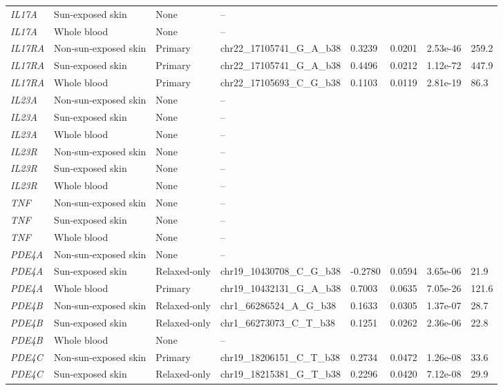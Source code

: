 \documentclass[10pt,a4paper]{article}
\begin{document}
\begin{landscape}
\begin{longtable}{p{1.7cm}p{3.3cm}p{2.2cm}p{5.0cm}p{1.8cm}p{1.8cm}p{2.2cm}p{1.3cm}}
\textit{IL17A} & Sun-exposed skin & None & -- &  &  &  &  \\
\textit{IL17A} & Whole blood & None & -- &  &  &  &  \\
\textit{IL17RA} & Non-sun-exposed skin & Primary & chr22\_17105741\_G\_A\_b38 & 0.3239 & 0.0201 & 2.53e-46 & 259.2 \\
\textit{IL17RA} & Sun-exposed skin & Primary & chr22\_17105741\_G\_A\_b38 & 0.4496 & 0.0212 & 1.12e-72 & 447.9 \\
\textit{IL17RA} & Whole blood & Primary & chr22\_17105693\_C\_G\_b38 & 0.1103 & 0.0119 & 2.81e-19 & 86.3 \\
\textit{IL23A} & Non-sun-exposed skin & None & -- &  &  &  &  \\
\textit{IL23A} & Sun-exposed skin & None & -- &  &  &  &  \\
\textit{IL23A} & Whole blood & None & -- &  &  &  &  \\
\textit{IL23R} & Non-sun-exposed skin & None & -- &  &  &  &  \\
\textit{IL23R} & Sun-exposed skin & None & -- &  &  &  &  \\
\textit{IL23R} & Whole blood & None & -- &  &  &  &  \\
\textit{TNF} & Non-sun-exposed skin & None & -- &  &  &  &  \\
\textit{TNF} & Sun-exposed skin & None & -- &  &  &  &  \\
\textit{TNF} & Whole blood & None & -- &  &  &  &  \\
\textit{PDE4A} & Non-sun-exposed skin & None & -- &  &  &  &  \\
\textit{PDE4A} & Sun-exposed skin & Relaxed-only & chr19\_10430708\_C\_G\_b38 & -0.2780 & 0.0594 & 3.65e-06 & 21.9 \\
\textit{PDE4A} & Whole blood & Primary & chr19\_10432131\_G\_A\_b38 & 0.7003 & 0.0635 & 7.05e-26 & 121.6 \\
\textit{PDE4B} & Non-sun-exposed skin & Relaxed-only & chr1\_66286524\_A\_G\_b38 & 0.1633 & 0.0305 & 1.37e-07 & 28.7 \\
\textit{PDE4B} & Sun-exposed skin & Relaxed-only & chr1\_66273073\_C\_T\_b38 & 0.1251 & 0.0262 & 2.36e-06 & 22.8 \\
\textit{PDE4B} & Whole blood & None & -- &  &  &  &  \\
\textit{PDE4C} & Non-sun-exposed skin & Primary & chr19\_18206151\_C\_T\_b38 & 0.2734 & 0.0472 & 1.26e-08 & 33.6 \\
\textit{PDE4C} & Sun-exposed skin & Relaxed-only & chr19\_18215381\_G\_T\_b38 & 0.2296 & 0.0420 & 7.12e-08 & 29.9 \\

\end{longtable}
\end{landscape}
\end{document}
